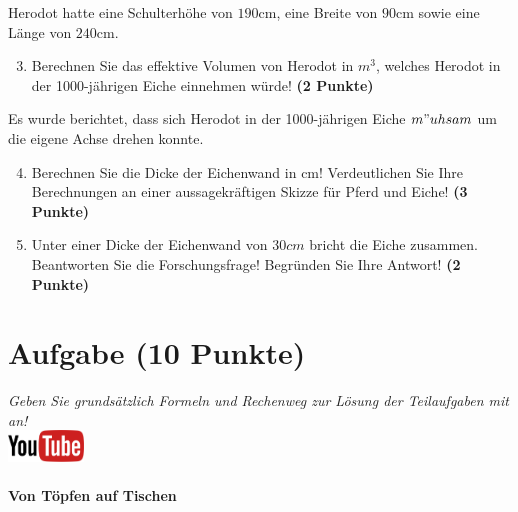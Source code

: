 \documentclass[a4paper, 9pt]{scrartcl}\usepackage[]{graphicx}\usepackage[]{xcolor}
\begin{document}
Herodot hatte eine Schulterh{\"o}he von $190$cm, eine Breite von
$90$cm sowie eine L{\"a}nge von  $240$cm.

\begin{enumerate}
  \setcounter{enumi}{2}
\item Berechnen Sie das effektive Volumen von Herodot in $m^3$, welches
  Herodot in der 1000-j{\"a}hrigen Eiche einnehmen w{\"u}rde! \textbf{(2 Punkte)}
\end{enumerate}

Es wurde berichtet, dass sich Herodot in der 1000-j{\"a}hrigen Eiche
$m{"u}hsam$ um die eigene Achse drehen konnte.

\begin{enumerate}
  \setcounter{enumi}{3}
\item Berechnen Sie die Dicke der Eichenwand in cm! Verdeutlichen Sie Ihre
  Berechnungen an einer aussagekr{\"a}ftigen Skizze f{\"u}r Pferd und Eiche! \textbf{(3 Punkte)} 
\item Unter einer Dicke der Eichenwand von $30cm$ bricht
  die Eiche zusammen. Beantworten Sie die Forschungsfrage! Begr{\"u}nden Sie
  Ihre Antwort! \textbf{(2 Punkte)} 
\end{enumerate}
 
\clearpage

\section{Aufgabe \hfill (10 Punkte)}

\textit{Geben Sie grunds{\"a}tzlich Formeln und Rechenweg zur L{\"o}sung der
  Teilaufgaben mit an!} \\[1Ex]

\hfill\href{https://youtu.be/57B-yYoFSk0}{\includegraphics[width =
  2cm]{img/youtube}} %
\hspace{2Ex}

\paragraph{Von T{\"o}pfen auf Tischen}
\end{document}
